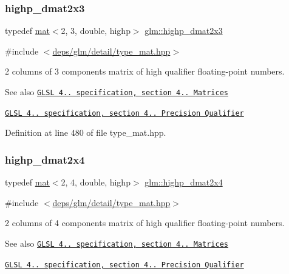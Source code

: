 \subsubsection{\texorpdfstring{highp\+\_\+dmat2x3}{highp\_dmat2x3}}
{\footnotesize\ttfamily typedef \hyperlink{structglm_1_1mat}{mat}$<$2, 3, double, highp$>$ \hyperlink{group__core__precision_gad7de433cb7f79959a191fc5c64fbfc4e}{glm\+::highp\+\_\+dmat2x3}}



{\ttfamily \#include $<$\hyperlink{type__mat_8hpp}{deps/glm/detail/type\+\_\+mat.\+hpp}$>$}

2 columns of 3 components matrix of high qualifier floating-\/point numbers.

\begin{DoxySeeAlso}{See also}
\href{http://www.opengl.org/registry/doc/GLSLangSpec.4.20.8.pdf}{\tt G\+L\+SL 4.. specification, section 4.. Matrices} 

\href{http://www.opengl.org/registry/doc/GLSLangSpec.4.20.8.pdf}{\tt G\+L\+SL 4.. specification, section 4.. Precision Qualifier} 
\end{DoxySeeAlso}


Definition at line 480 of file type\+\_\+mat.\+hpp.

\mbox{\label{group__core__precision_gaea7c625705d849f1a55c9bfcb2585875}} 
\subsubsection{\texorpdfstring{highp\+\_\+dmat2x4}{highp\_dmat2x4}}
{\footnotesize\ttfamily typedef \hyperlink{structglm_1_1mat}{mat}$<$2, 4, double, highp$>$ \hyperlink{group__core__precision_gaea7c625705d849f1a55c9bfcb2585875}{glm\+::highp\+\_\+dmat2x4}}



{\ttfamily \#include $<$\hyperlink{type__mat_8hpp}{deps/glm/detail/type\+\_\+mat.\+hpp}$>$}

2 columns of 4 components matrix of high qualifier floating-\/point numbers.

\begin{DoxySeeAlso}{See also}
\href{http://www.opengl.org/registry/doc/GLSLangSpec.4.20.8.pdf}{\tt G\+L\+SL 4.. specification, section 4.. Matrices} 

\href{http://www.opengl.org/registry/doc/GLSLangSpec.4.20.8.pdf}{\tt G\+L\+SL 4.. specification, section 4.. Precision Qualifier} 
\end{DoxySeeAlso}


